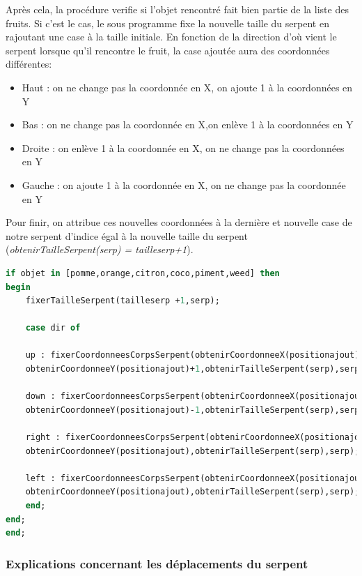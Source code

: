 \documentclass[11pt,a4paper]{article}
\begin{document}
  
  \normalsize
  Après cela, la procédure verifie si l'objet rencontré fait bien partie de la liste des fruits. Si c'est le cas, le sous programme fixe la nouvelle taille du serpent en rajoutant une case à la taille initiale. En fonction de la direction d'où vient le serpent lorsque qu'il rencontre le fruit, la case ajoutée aura des coordonnées différentes:

\begin{itemize}
 \item Haut : on ne change pas la coordonnée en X, on ajoute 1 à la coordonnées en Y
 \item Bas : on ne change pas la coordonnée en X,on enlève 1 à la coordonnées en Y
 \item Droite : on enlève 1 à la coordonnée en X, on ne change pas la coordonnées en Y
 \item Gauche : on ajoute 1 à la coordonnée en X, on ne change pas la coordonnée en Y
\end{itemize}
Pour finir, on attribue ces nouvelles coordonnées à la dernière et nouvelle case de notre serpent d'indice égal à la nouvelle taille du serpent (\textit{obtenirTailleSerpent(serp) = tailleserp+1}).
\small
  \begin{lstlisting}[language=Pascal,frame=single,caption=Deuxième partie du code source de la procédure grandirSerpent]
if objet in [pomme,orange,citron,coco,piment,weed] then
begin
	fixerTailleSerpent(tailleserp +1,serp);
	
	case dir of
	
	up : fixerCoordonneesCorpsSerpent(obtenirCoordonneeX(positionajout),
	obtenirCoordonneeY(positionajout)+1,obtenirTailleSerpent(serp),serp);
	
	down : fixerCoordonneesCorpsSerpent(obtenirCoordonneeX(positionajout),
	obtenirCoordonneeY(positionajout)-1,obtenirTailleSerpent(serp),serp);
	
	right : fixerCoordonneesCorpsSerpent(obtenirCoordonneeX(positionajout)-1,
	obtenirCoordonneeY(positionajout),obtenirTailleSerpent(serp),serp);
	
	left : fixerCoordonneesCorpsSerpent(obtenirCoordonneeX(positionajout)+1,
	obtenirCoordonneeY(positionajout),obtenirTailleSerpent(serp),serp);
	end;
end;
end;
\end{lstlisting}
\normalsize
        
        
        \subsubsection{Explications concernant les déplacements du serpent}
        
\end{document}
